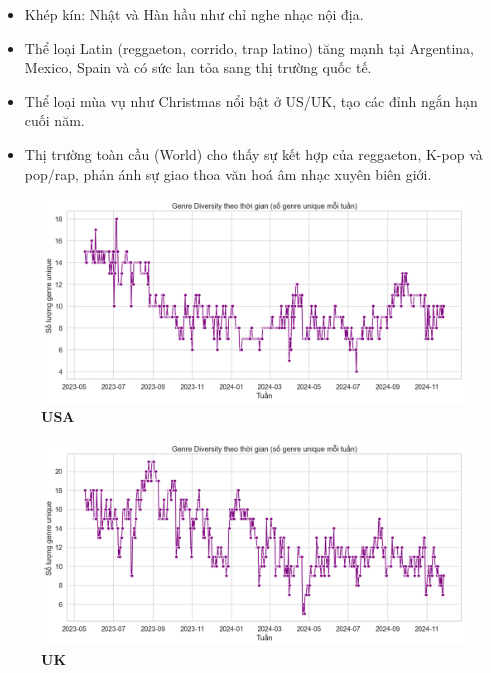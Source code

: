 \begin{itemize}
\begin{itemize}
        \item Khép kín: Nhật và Hàn hầu như chỉ nghe nhạc nội địa.
        \item Thể loại Latin (reggaeton, corrido, trap latino) tăng mạnh tại Argentina, Mexico, Spain và có sức lan tỏa sang thị trường quốc tế.
        \item Thể loại mùa vụ như Christmas nổi bật ở US/UK, tạo các đỉnh ngắn hạn cuối năm.

        \item Thị trường toàn cầu (World) cho thấy sự kết hợp của reggaeton, K-pop và pop/rap, phản ánh sự giao thoa văn hoá âm nhạc xuyên biên giới.
    \end{itemize}

    \begin{figure}[H]
        \centering
        \begin{minipage}{0.45\textwidth}
            \centering
            \includegraphics[width=\linewidth]{../graphics/data_top50/figure/24/EDA_usa.png}
            \\[4pt] {\small \textbf{USA}}
        \end{minipage}
        \hfill
        \begin{minipage}{0.45\textwidth}
            \centering
            \includegraphics[width=\linewidth]{../graphics/data_top50/figure/24/EDA_uk.png}
            \\[4pt] {\small \textbf{UK}}
        \end{minipage}


\end{figure}
\end{itemize}
